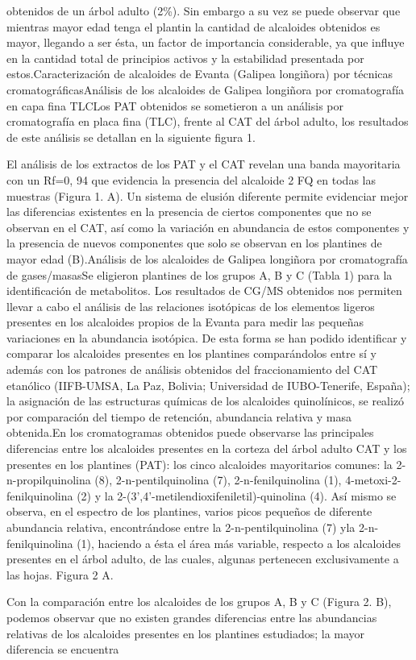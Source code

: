 \documentclass{article}
\begin{document}
{obtenidos de un árbol adulto (2\%). Sin embargo a su vez se puede observar que mientras mayor edad tenga el plantin la cantidad de alcaloides obtenidos es mayor, llegando a ser ésta, un factor de importancia considerable, ya que influye en la cantidad total de principios activos y la estabilidad presentada por estos.}{Caracterización de alcaloides de Evanta (Galipea longiñora) por técnicas cromatográficas}{Análisis de los alcaloides de Galipea longiñora por cromatografía en capa fina TLC}{Los PAT obtenidos se sometieron a un análisis por cromatografía en placa fina (TLC), frente al CAT del árbol adulto, los resultados de este análisis se detallan en la siguiente figura 1.}\begin{Center}\end{Center}\begin{Center}\end{Center}{El análisis de los extractos de los PAT y el CAT revelan una banda mayoritaria con un Rf=0, 94 que evidencia la presencia del alcaloide 2 FQ en todas las muestras (Figura 1. A). Un sistema de elusión diferente permite evidenciar mejor las diferencias existentes en la presencia de ciertos componentes que no se observan en el CAT, así como la variación en abundancia de estos componentes y la presencia de nuevos componentes que solo se observan en los plantines de mayor edad (B).}{Análisis de los alcaloides de Galipea longiñora por cromatografía de gases/masas}{Se eligieron plantines de los grupos A, B y C (Tabla 1) para la identificación de metabolitos. Los resultados de CG/MS obtenidos nos permiten llevar a cabo el análisis de las relaciones isotópicas de los elementos ligeros presentes en los alcaloides propios de la Evanta para medir las pequeñas variaciones en la abundancia isotópica. De esta forma se han podido identificar y comparar los alcaloides presentes en los plantines comparándolos entre sí y además con los patrones de análisis obtenidos del fraccionamiento del CAT etanólico (IIFB-UMSA, La Paz, Bolivia; Universidad de IUBO-Tenerife, España); la asignación de las estructuras químicas de los alcaloides quinolínicos, se realizó por comparación del tiempo de retención, abundancia relativa y masa obtenida.}{En los cromatogramas obtenidos puede observarse las principales diferencias entre los alcaloides presentes en la corteza del árbol adulto CAT y los presentes en los plantines (PAT): los cinco alcaloides mayoritarios comunes: la 2-n-propilquinolina (8), 2-n-pentilquinolina (7), 2-n-fenilquinolina (1), 4-metoxi-2-fenilquinolina (2) y la 2-(3',4'-metilendioxifeniletil)-quinolina (4). Así mismo se observa, en el espectro de los plantines, varios picos pequeños de diferente abundancia relativa, encontrándose entre la 2-n-pentilquinolina (7) yla 2-n-fenilquinolina (1), haciendo a ésta el área más variable, respecto a los alcaloides presentes en el árbol adulto, de las cuales, algunas pertenecen exclusivamente a las hojas. Figura 2 A.}\begin{Center}\end{Center}{Con la comparación entre los alcaloides de los grupos A, B y C (Figura 2. B), podemos observar que no existen grandes diferencias entre las abundancias relativas de los alcaloides presentes en los plantines estudiados; la mayor diferencia se encuentra }
\end{document}
